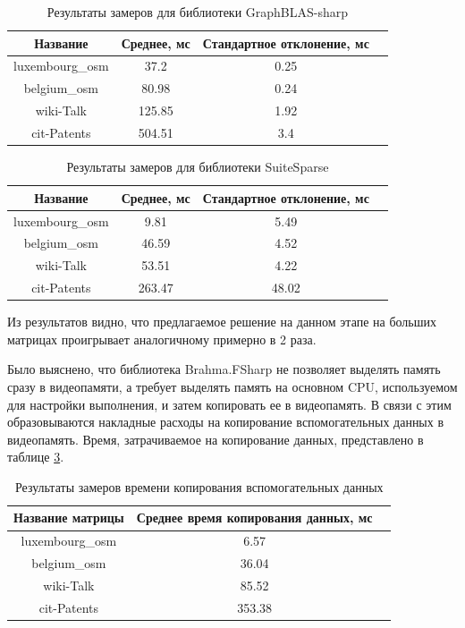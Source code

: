 \documentclass[14pt]{matmex-diploma-custom}
\begin{document}
\begin{table}[h]
\center{}

\begin{tabular}{ | c | c | c | c | }
\hline
Название & Среднее, мс & Стандартное отклонение, мс \\ \hline
luxembourg\_osm & 37.2 & 0.25 \\ \hline
belgium\_osm & 80.98 & 0.24 \\ \hline
wiki-Talk & 125.85 & 1.92 \\ \hline
cit-Patents & 504.51 & 3.4 \\ \hline
\end{tabular}

\caption{Результаты замеров для библиотеки GraphBLAS-sharp}
\label{graphblas-sharp}
\end{table}

\begin{table}[h]
\center{}

\begin{tabular}{ | c | c | c | c | }
\hline
Название & Среднее, мс & Стандартное отклонение, мс \\ \hline
luxembourg\_osm & 9.81 & 5.49 \\ \hline
belgium\_osm & 46.59 & 4.52 \\ \hline
wiki-Talk & 53.51 & 4.22 \\ \hline
cit-Patents & 263.47 & 48.02 \\ \hline
\end{tabular}

\caption{Результаты замеров для библиотеки SuiteSparse}
\label{suitesparse}
\end{table}

Из результатов видно, что предлагаемое решение на данном этапе на больших матрицах проигрывает аналогичному примерно в 2 раза.

Было выяснено, что библиотека Brahma.FSharp не позволяет выделять память сразу в видеопамяти, а требует выделять память на основном CPU, используемом для настройки выполнения, и затем копировать ее в видеопамять. В связи с этим образовываются накладные расходы на копирование вспомогательных данных в видеопамять. Время, затрачиваемое на копирование данных, представлено в таблице \ref{time}.

\begin{table}[h]
    \center{}
    
    \begin{tabular}{ | c | c | c | }
    \hline
    Название матрицы & Среднее время копирования данных, мс \\ \hline
    luxembourg\_osm & 6.57 \\ \hline
    belgium\_osm & 36.04 \\ \hline
    wiki-Talk & 85.52 \\ \hline
    cit-Patents & 353.38 \\ \hline
    \end{tabular}
    
    \caption{Результаты замеров времени копирования вспомогательных данных}
    \label{time}
    \end{table}
\end{document}
